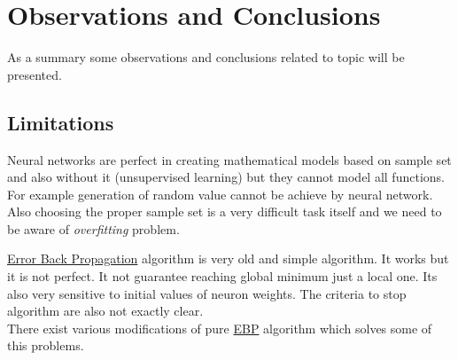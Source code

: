 \section{Observations and Conclusions}
\label{ObservationsConclusions}

As a summary some observations and conclusions related to topic will be presented.

\subsection{Limitations}
\label{Limitations}

Neural networks are perfect in creating mathematical models based on sample set and also without it (unsupervised learning) but they cannot model all functions. For example generation of random value cannot be achieve by neural network. Also choosing the proper sample set is a very difficult task itself and we need to be aware of \textit{overfitting} problem.

\hyperref[sec:Training]{Error Back Propagation} algorithm is very old and simple algorithm. It works but it is not perfect. It not guarantee reaching global minimum just a local one. Its also very sensitive to initial values of neuron weights. The criteria to stop algorithm are also not exactly clear. \\
There exist various modifications of pure \hyperref[sec:Training]{EBP} algorithm which solves some of this problems.

